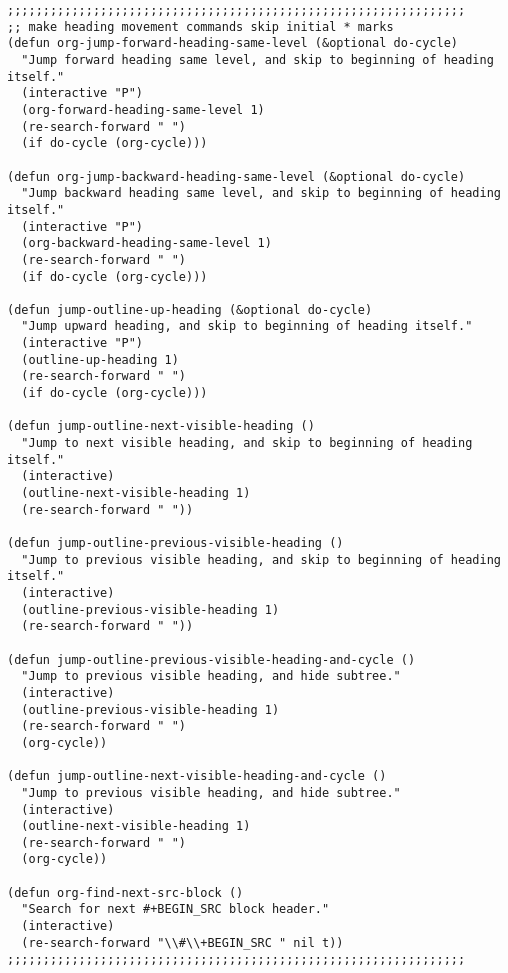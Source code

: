 \documentclass[11pt]{article}
\begin{document}
\begin{verbatim}
;;;;;;;;;;;;;;;;;;;;;;;;;;;;;;;;;;;;;;;;;;;;;;;;;;;;;;;;;;;;;;;;
;; make heading movement commands skip initial * marks
(defun org-jump-forward-heading-same-level (&optional do-cycle)
  "Jump forward heading same level, and skip to beginning of heading itself."
  (interactive "P")
  (org-forward-heading-same-level 1)
  (re-search-forward " ")
  (if do-cycle (org-cycle)))

(defun org-jump-backward-heading-same-level (&optional do-cycle)
  "Jump backward heading same level, and skip to beginning of heading itself."
  (interactive "P")
  (org-backward-heading-same-level 1)
  (re-search-forward " ")
  (if do-cycle (org-cycle)))

(defun jump-outline-up-heading (&optional do-cycle)
  "Jump upward heading, and skip to beginning of heading itself."
  (interactive "P")
  (outline-up-heading 1)
  (re-search-forward " ")
  (if do-cycle (org-cycle)))

(defun jump-outline-next-visible-heading ()
  "Jump to next visible heading, and skip to beginning of heading itself."
  (interactive)
  (outline-next-visible-heading 1)
  (re-search-forward " "))

(defun jump-outline-previous-visible-heading ()
  "Jump to previous visible heading, and skip to beginning of heading itself."
  (interactive)
  (outline-previous-visible-heading 1)
  (re-search-forward " "))

(defun jump-outline-previous-visible-heading-and-cycle ()
  "Jump to previous visible heading, and hide subtree."
  (interactive)
  (outline-previous-visible-heading 1)
  (re-search-forward " ")
  (org-cycle))

(defun jump-outline-next-visible-heading-and-cycle ()
  "Jump to previous visible heading, and hide subtree."
  (interactive)
  (outline-next-visible-heading 1)
  (re-search-forward " ")
  (org-cycle))

(defun org-find-next-src-block ()
  "Search for next #+BEGIN_SRC block header."
  (interactive)
  (re-search-forward "\\#\\+BEGIN_SRC " nil t))
;;;;;;;;;;;;;;;;;;;;;;;;;;;;;;;;;;;;;;;;;;;;;;;;;;;;;;;;;;;;;;;;


\end{verbatim}
\end{document}
